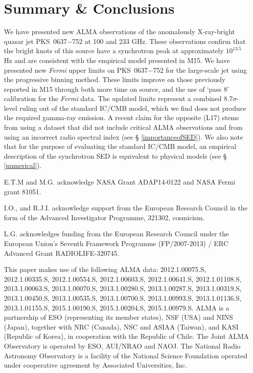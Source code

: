 \documentclass[twocolumn]{aastex61}
\begin{document}
\section{Summary \& Conclusions}
We have presented new ALMA observations of the anomalously
X-ray-bright quasar jet PKS~0637$-$752 at 100 and 233 GHz. These
observations confirm that the bright knots of this source have a
synchrotron peak at approximately $10^{13.5}$ Hz and are consistent
with the empirical model presented in M15.
We have presented new \emph{Fermi} upper limits on PKS~0637$-$752 for
the large-scale jet using the progressive binning method.  These
limits improve on those previously reported in M15 through both more
time on source, and the use of `pass 8' calibration for the
\emph{Fermi} data.  The updated limits represent a combined
8.7$\sigma$-level ruling out of the standard IC/CMB model, which we
find does not produce the required gamma-ray emission. A recent claim
for the opposite (L17) stems from using a dataset that did not include critical ALMA observations and from using an incorrect radio spectral index (see \S
\ref{importanceofSED}).  We also note that for the purpose of
evaluating the standard IC/CMB model, an empirical description of the
synchrotron SED is equivalent to physical models (see \S
\ref{numerical}).


\acknowledgments

E.T.M and M.G. acknowledge NASA Grant ADAP14-0122 and NASA Fermi
grant 81051.

I.O., and R.J.I. acknowledge support from the European Research
Council in the form of the Advanced Investigator Programme, 321302,
{\sc cosmicism}.

L.G. acknowledges funding from the European Research Council under the
European Union’s Seventh Framework Programme (FP/2007-2013) / ERC
Advanced Grant RADIOLIFE-320745.

This paper makes use of the following ALMA data: 2012.1.00075.S,
2012.1.00335.S, 2012.1.00554.S, 2012.1.00603.S, 2012.1.00641.S,
2012.1.01108.S, 2013.1.00063.S, 2013.1.00070.S, 2013.1.00280.S,
2013.1.00287.S, 2013.1.00319.S, 2013.1.00450.S, 2013.1.00535.S,
2013.1.00700.S, 2013.1.00993.S, 2013.1.01136.S, 2013.1.01155.S,
2015.1.00190.S, 2015.1.00204.S, 2015.1.00979.S. ALMA is a partnership
of ESO (representing its member states), NSF (USA) and NINS (Japan),
together with NRC (Canada), NSC and ASIAA (Taiwan), and KASI (Republic
of Korea), in cooperation with the Republic of Chile. The Joint ALMA
Observatory is operated by ESO, AUI/NRAO and NAOJ. The National Radio
Astronomy Observatory is a facility of the National Science Foundation
operated under cooperative agreement by Associated Universities, Inc.
\end{document}
